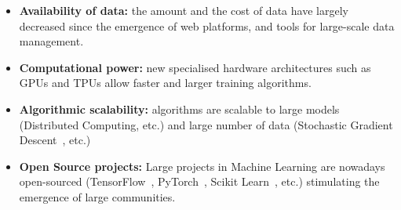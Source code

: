 \begin{itemize}
    \item \textbf{Availability of data:} the amount and the cost of data have largely decreased since the emergence of web platforms, and tools for large-scale data management.
    \item \textbf{Computational power:} new specialised hardware architectures such as GPUs and TPUs allow faster and larger training algorithms.
    \item \textbf{Algorithmic scalability:} algorithms are scalable to large models (Distributed Computing, etc.) and large number of data (Stochastic Gradient Descent~\citep{bottou2010large}, etc.)
    \item \textbf{Open Source projects:} Large projects in Machine Learning are nowadays open-sourced (TensorFlow~\citep{abadi2016deep}, PyTorch~\citep{paszke2017automatic}, Scikit Learn~\citep{pedregosa2011scikit}, etc.) stimulating the emergence of large communities.
\end{itemize}

